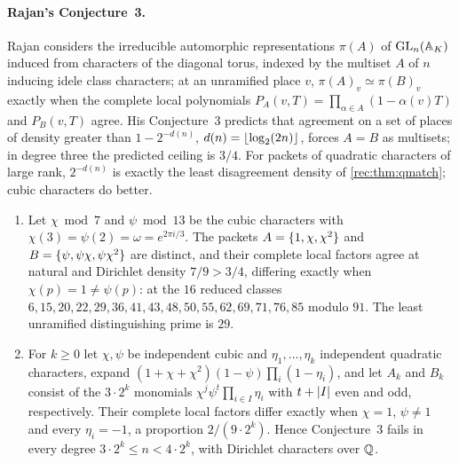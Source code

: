 \paragraph{Rajan's Conjecture~3.} Rajan considers the irreducible automorphic representations $\pi(A)$ of
$\operatorname{GL}_n(\mathbb A_K)$ induced from characters of the diagonal torus, indexed by the multiset $A$ of $n$ inducing
idele class characters; at an unramified place $v$, $\pi(A)_v\simeq\pi(B)_v$ exactly when the complete local
polynomials $P_A(v,T)=\prod_{\alpha\in A}(1-\alpha(v)T)$ and $P_B(v,T)$ agree. His Conjecture~3
\cite[p.~698]{Rajan2000Refinement} predicts that agreement on a set of places of
density greater than $1-2^{-d(n)}$, $d(n)=\lfloor\log_2(2n)\rfloor$, forces $A=B$ as multisets; in degree three the
predicted ceiling is $3/4$. For packets of quadratic characters of large rank, $2^{-d(n)}$ is exactly the least
disagreement density of \cref{rec:thm:qmatch}; cubic characters do better.

\begin{theorem}\label{eul:thm:rajan}
\begin{enumerate}[label=\textup{(\roman*)}]
\item Let $\chi\bmod7$ and $\psi\bmod13$ be the cubic characters with $\chi(3)=\psi(2)=\omega=e^{2\pi i/3}$. The
packets $A=\{1,\chi,\chi^2\}$ and $B=\{\psi,\psi\chi,\psi\chi^2\}$ are distinct, and their complete local factors
agree at natural and Dirichlet density $7/9>3/4$, differing exactly when $\chi(p)=1\ne\psi(p)$: at the $16$ reduced
classes $6,15,20,22,29,36,41,43,48,50,55,62,69,71,76,85$ modulo $91$. The least unramified distinguishing prime is
$29$.
\item For $k\ge0$ let $\chi,\psi$ be independent cubic and $\eta_1,\dots,\eta_k$ independent quadratic characters,
expand $(1+\chi+\chi^2)(1-\psi)\prod_i(1-\eta_i)$, and let $A_k$ and $B_k$ consist of the $3\cdot2^k$ monomials
$\chi^j\psi^t\prod_{i\in I}\eta_i$ with $t+\lvert I\rvert$ even and odd, respectively. Their complete local factors differ
exactly when $\chi=1$, $\psi\ne1$ and every $\eta_i=-1$, a proportion $2/(9\cdot2^k)$. Hence Conjecture~3 fails in
every degree $3\cdot2^k\le n<4\cdot2^k$, with Dirichlet characters over $\mathbb{Q}$.
\end{enumerate}
\end{theorem}

